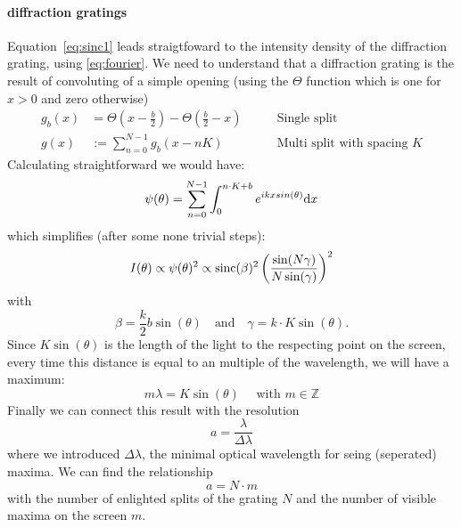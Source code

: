 \paragraph{diffraction gratings} 
Equation~\eqref{eq:sinc1} leads straigtfoward to the intensity density of
the diffraction grating, using \eqref{eq:fourier}. We need to understand 
that a diffraction grating is the result of convoluting of a simple opening
(using the $\Theta$ function which is one for $x>0$ and zero otherwise)
\begin{align}
    \label{eq:multisplit}
    g_b(x) &= \Theta(x - \frac{b}{2}) - \Theta( \frac{b}{2} - x ) \qquad
           &\text{Single split} \\ 
   g(x)   &:= \sum_{n=0}^{N-1} g_b(x-nK) 
         \qquad &\text{Multi split with spacing } K
\end{align}
Calculating straightforward we would have:
\begin{equation}
    \psi(\theta) = \sum_{n = 0}^{N-1}  \int^{n \cdot K + b}_{0} e^{i k x sin(\theta)} \mathrm{d} x
\end{equation}
which simplifies (after some none trivial steps):
\begin{equation}
    I(\theta) \propto \psi(\theta)^2 \propto \mathrm{sinc}(\beta)^2 \left (\frac{\sin(N\gamma)}{N \sin(\gamma)}\right )^2
\end{equation}
with
\begin{equation}
    \beta = \frac{k}{2}b \sin(\theta) \quad \text{and} \quad \gamma = k\cdot K \sin(\theta).
\end{equation}
Since $K \sin (\theta)$ is the length of the light to the respecting point on the screen, every time
this distance is equal to an multiple of the wavelength, we will have a maximum:
\begin{equation}
    m \lambda = K \sin(\theta) \quad \text{ with }m \in \mathbb{Z}
    \label{eq:N_lines_interference}
\end{equation}
Finally we can connect this result with the resolution
\begin{equation}
    a = \frac{\lambda}{\Delta \lambda}
\end{equation}
where we introduced $\Delta \lambda$, the minimal optical wavelength for seing
(seperated) maxima. We can find the relationship
\begin{equation}
    a = N \cdot m
\end{equation}
with the number of enlighted splits of the grating $N$ and the number of 
visible maxima on the screen $m$.
\clearpage
